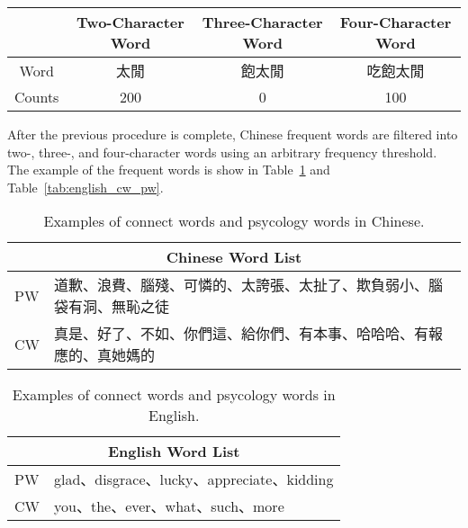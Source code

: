 \documentclass[12pt,a4paper]{report}
\theoremstyle{definition}
\begin{document}
\begin{CJK}{UTF8}{bsmi}
\begin{CJK}{UTF8}{bsmi}
\begin{enumerate}
        \begin{table}[H]
        \centering
        \begin{tabular}{|c|c|c|c|}
            \hline
             & Two-Character Word  & Three-Character Word  & Four-Character Word  \\
            \hline
            Word & 太閒 & 飽太閒 & 吃飽太閒\\
            \hline
            Counts & 200 & 0 & 100 \\
            \hline
        \end{tabular}
        \end{table}
    \end{enumerate}
    \end{CJK}
    \par After the previous procedure is complete, Chinese frequent words are filtered into two-, three-, and four-character words using an arbitrary frequency threshold. The example of the frequent words is show in Table~\ref{tab:chinese_cw_pw} and Table~\ref{tab:english_cw_pw}.
    \begin{CJK}{UTF8}{bsmi}
    \begin{table}[H]
        \centering
        \begin{tabular}{|p{2cm}|p{9cm}|}
        \hline
        \multicolumn{2}{|c|}{Chinese Word List} \\
            \hline
            PW  & 道歉、浪費、腦殘、可憐的、太誇張、太扯了、欺負弱小、腦袋有洞、無恥之徒  \\
            \hline
            CW & 真是、好了、不如、你們這、給你們、有本事、哈哈哈、有報應的、真她媽的\\
            \hline
        \end{tabular}
        \caption{Examples of connect words and psycology words in Chinese.}
        \label{tab:chinese_cw_pw}
    \end{table}
    \begin{table}[H]
        \centering
        \begin{tabular}{|p{2cm}|p{9cm}|}
        \hline
        \multicolumn{2}{|c|}{English Word List} \\
            \hline
            PW  & glad、disgrace、lucky、appreciate、kidding  \\
            \hline
            CW & you、the、ever、what、such、more\\
            \hline
        \end{tabular}
        \caption{Examples of connect words and psycology words in English.}

\end{table}
\end{CJK}
\end{CJK}
\end{document}
